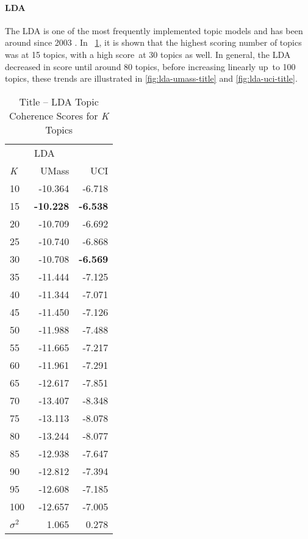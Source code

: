 \documentclass[letterpaper,12pt]{article}
\begin{document}
\paragraph{LDA}

The LDA is one of the most frequently implemented topic models and has been around since 2003 \cite{blei2003latent}. In \
\ref{tab:lda_title_tc}, it is shown that the highest scoring number of topics was at 15 topics, with a high score\
at 30 topics as well. In general, the LDA decreased in score until around 80 topics, before increasing linearly up\
to 100 topics, these trends are illustrated in \ref{fig:lda-umass-title} and \ref{fig:lda-uci-title}.

\begin{table}
	\caption{\label{tab:lda_title_tc} Title -- LDA Topic Coherence Scores for \emph{K} Topics}
	\begin{center}
		\begin{tabular}{lrr}
			\toprule
			{} & \multicolumn{2}{l}{LDA} \\
			\emph{K} &   UMass &    UCI \\
			\midrule
			10  & -10.364 & -6.718 \\
			15  & \textbf{-10.228} & \textbf{-6.538} \\
			20  & -10.709 & -6.692 \\
			25  & -10.740 & -6.868 \\
			30  & -10.708 & \textbf{-6.569} \\
			35  & -11.444 & -7.125 \\
			40  & -11.344 & -7.071 \\
			45  & -11.450 & -7.126 \\
			50  & -11.988 & -7.488 \\
			55  & -11.665 & -7.217 \\
			60  & -11.961 & -7.291 \\
			65  & -12.617 & -7.851 \\
			70  & -13.407 & -8.348 \\
			75  & -13.113 & -8.078 \\
			80  & -13.244 & -8.077 \\
			85  & -12.938 & -7.647 \\
			90  & -12.812 & -7.394 \\
			95  & -12.608 & -7.185 \\
			100 & -12.657 & -7.005 \\
			\midrule
			$\sigma^2$ & 1.065 & 0.278 \\
			\bottomrule
			\end{tabular}
	\end{center}
\end{table}
\end{document}
